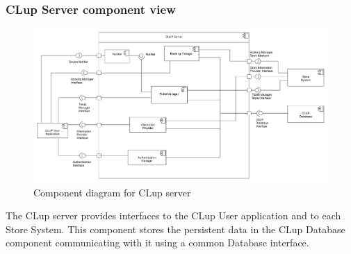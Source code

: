 \subsubsection{CLup Server component view}
\begin{figure}[H]
    \includegraphics[width=\textwidth]{Images/UML_server_component.pdf}
    \caption{\label{fig:UML_comp_Clup_server}Component diagram for CLup server}
\end{figure}

The CLup server provides interfaces to the CLup User application and to each Store System. This component stores the persistent data in the CLup Database component communicating with it using a common Database interface.

